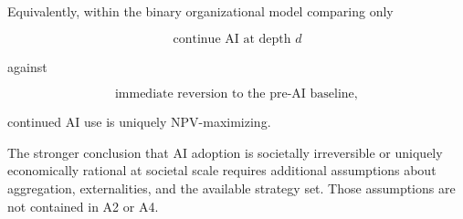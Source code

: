 Equivalently, within the binary organizational model comparing only

\[
\text{continue AI at depth }d
\]

against

\[
\text{immediate reversion to the pre-AI baseline},
\]

continued AI use is uniquely NPV-maximizing.

The stronger conclusion that AI adoption is societally irreversible or uniquely economically rational at societal scale requires additional assumptions about aggregation, externalities, and the available strategy set. Those assumptions are not contained in A2 or A4.